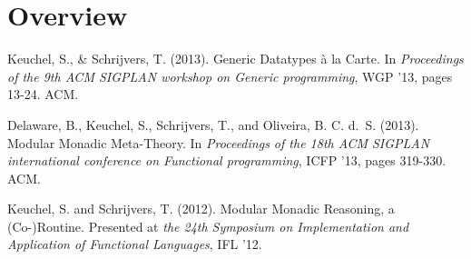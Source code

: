 \section{Overview}

\begin{center}
  \begin{minipage}{0.8\columnwidth}
    Keuchel, S., \& Schrijvers, T. (2013).
    \newblock Generic Datatypes à la Carte.
    \newblock In {\em Proceedings of the 9th ACM SIGPLAN workshop on Generic
      programming}, WGP ’13, pages 13-24. ACM.
  \end{minipage}
\end{center}

\begin{center}
  \begin{minipage}{0.8\columnwidth}
    Delaware, B., Keuchel, S., Schrijvers, T., and Oliveira,
    B. C. d.~S. (2013).
    \newblock Modular Monadic Meta-Theory.
    \newblock In {\em Proceedings of the 18th ACM SIGPLAN international
      conference on Functional programming}, ICFP '13, pages 319-330. ACM.
  \end{minipage}
\end{center}

\begin{center}
  \begin{minipage}{0.8\columnwidth}
    Keuchel, S. and Schrijvers, T. (2012).
    \newblock Modular Monadic Reasoning, a (Co-)Routine.
    \newblock Presented at \emph{the 24th Symposium on Implementation and
      Application of Functional Languages}, IFL '12.
  \end{minipage}
\end{center}



